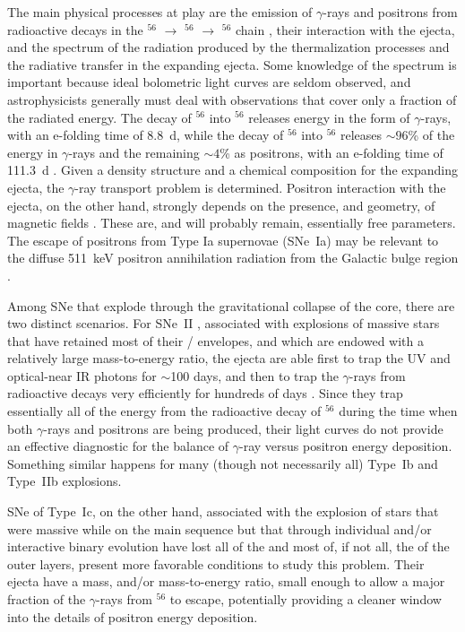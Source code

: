 \documentclass[12pt,manuscript]{aastex}
\begin{document}
The main physical processes at play are the emission of 
$\gamma$-rays and positrons from radioactive decays in the
$^{56}$ $\rightarrow$ $^{56}$ 
$\rightarrow$ $^{56}$
chain \citep{cym69}, their interaction with the ejecta, and the
spectrum of the radiation produced by the thermalization 
processes and the radiative transfer in the expanding ejecta.
%
Some knowledge of the spectrum is important
because ideal bolometric light curves are seldom observed,
and astrophysicists generally must deal with observations that 
cover only a fraction of the radiated energy.
%
The decay of $^{56}$ into $^{56}$ releases
energy in the form of  $\gamma$-rays, with an e-folding time of
8.8~d, while the decay of $^{56}$ into $^{56}$ 
releases $\sim 96$\% of the energy in $\gamma$-rays and the
remaining $\sim 4$\% as positrons, with an e-folding time of 
111.3~d \citep{dandt98}.
%
Given a density structure and a chemical composition for
the expanding ejecta, the $\gamma$-ray transport problem is determined.
%
Positron interaction with the ejecta, on the other hand, strongly
depends on the presence, and geometry, of magnetic fields 
\citep{rlands98}.
%
These are, and will probably remain, essentially free parameters.
%
The escape of positrons from Type Ia supernovae (SNe~Ia) may be 
relevant to the diffuse 511~keV positron annihilation radiation 
from the Galactic bulge region \citep{kno05}.


Among SNe that explode through the gravitational collapse of 
the core, there are two distinct scenarios.
%
For SNe~II \citep[see][for a review of SN types]{filip97}, 
associated with explosions of massive stars that 
have retained most of their /
envelopes, and which are endowed with a relatively large 
mass-to-energy ratio, the ejecta are able first to trap the 
UV and optical-near IR photons for $\sim$100 days, and then to trap the
$\gamma$-rays from radioactive decays very efficiently for hundreds 
of days \citep[e.g.][]{cetal96a,eetal03}.
%
Since they trap essentially all of the energy from the radioactive 
decay of $^{56}$ during the time when both 
$\gamma$-rays and positrons are being produced, their light 
curves do not provide an effective diagnostic for the balance 
of $\gamma$-ray versus positron energy deposition.
%
Something similar happens for many (though not necessarily
all) Type~Ib and Type~IIb explosions.


SNe of Type~Ic, on the other hand, associated with the explosion of 
stars that were massive while on the main sequence but that 
through individual and/or interactive binary evolution have lost 
all of the  and most of, if not all, the  
of the outer layers, present more favorable conditions to study 
this problem.
%
Their ejecta have a mass, and/or mass-to-energy ratio, small enough 
to allow a major fraction of the $\gamma$-rays from $^{56}$ 
to escape, potentially providing a cleaner window into the details 
of positron energy deposition.
\end{document}
